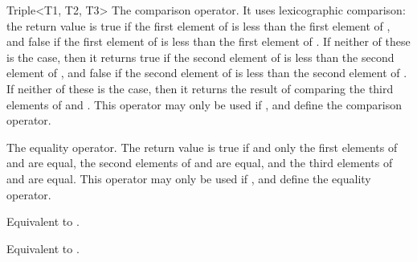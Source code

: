 \begin{ccRefClass}{Triple<T1, T2, T3>}
   {The
    comparison operator. It uses lexicographic comparison: the return
    value is true if the first element of  is less than the
    first element of , and false if the first element of
     is less than the first element of . If neither of
    these is the case, then it returns true if the second element of
     is less than the second element of , and false if
    the second element of  is less than the second element of
    .  If neither of these is the case, then it returns the
    result of comparing the third elements of  and .
    This operator may only be used if ,  and 
    define the comparison operator.}

   {The
    equality operator. The return value is true if and only the first
    elements of  and  are equal, the second elements of
     and  are equal, and the third elements of 
    and  are equal.  This operator may only be used if
    ,  and  define the equality operator.}
  
   {Equivalent to
    .}
  
   {Equivalent to
    .}

\end{ccRefClass}


